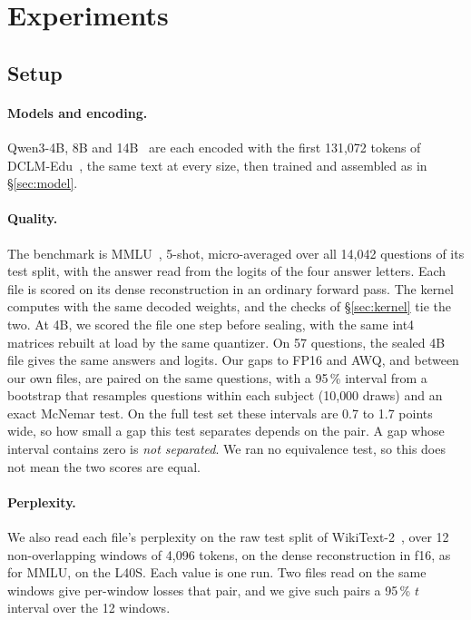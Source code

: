 \section{Experiments}
\label{sec:experiments}

\subsection{Setup}
\label{sec:setup}

\paragraph{Models and encoding.} Qwen3-4B, 8B and 14B~\citep{qwen3_2025} are
each encoded with the first 131{,}072 tokens of DCLM-Edu~\citep{dclmedu}, the
same text at every size, then trained and assembled as in \S\ref{sec:model}.

\paragraph{Quality.} The benchmark is MMLU~\citep{mmlu2021}, 5-shot,
micro-averaged over all 14{,}042 questions of its test split, with the answer
read from the logits of the four answer letters. Each file is scored on its
dense reconstruction in an ordinary forward pass. The kernel computes with the
same decoded weights, and the checks of \S\ref{sec:kernel} tie the two. At 4B,
we scored the file one step before sealing, with the same int4 matrices
rebuilt at load by the same quantizer. On 57 questions, the sealed 4B file
gives the same answers and logits. Our gaps to FP16 and AWQ, and between our
own files, are paired on the same questions, with a 95\,\% interval from a
bootstrap that resamples questions within each subject (10{,}000 draws) and an
exact McNemar test. On the full test set these intervals are 0.7 to 1.7 points
wide, so how small a gap this test separates depends on the pair. A gap whose interval contains zero is \emph{not
separated}. We ran no equivalence test, so this does not mean the two scores
are equal.

\paragraph{Perplexity.} We also read each file's perplexity on the raw test
split of WikiText-2~\citep{wikitext2016}, over 12 non-overlapping windows of
4{,}096 tokens, on the dense reconstruction in f16, as for MMLU, on the L40S.
Each value is one run. Two files read on the same windows give per-window
losses that pair, and we give such pairs a 95\,\% $t$ interval over the 12
windows.

